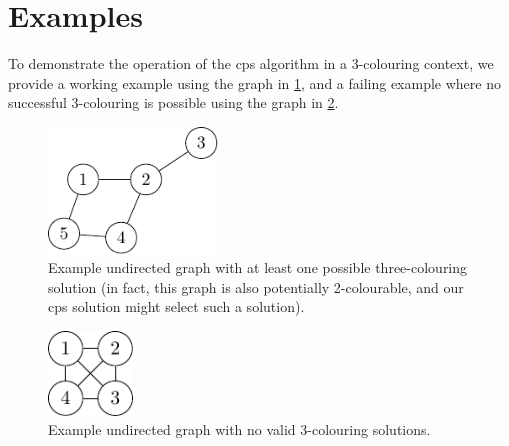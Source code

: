 \section{\label{sec:gcol:examples}Examples}

To demonstrate the operation of the \gls{cps} algorithm in a 3-colouring context, we provide a working example using the graph in \cref{fig:gcol:examplegraph}, and a failing example where no successful 3-colouring is possible using the graph in \cref{fig:gcol:examplegraphnosol}.

\begin{figure}
    \centering
    \includegraphics[width=0.4\textwidth]{chapters/gcol/figs/examplegraph1-figure2.pdf}
    \caption[Example undirected graph with at least one possible three-colouring solution]{Example undirected graph with at least one possible three-colouring solution (in fact, this graph is also potentially 2-colourable, and our \gls{cps} solution might select such a solution).}
    \label{fig:gcol:examplegraph}
\end{figure}

\begin{figure}
    \centering
    \includegraphics[width=0.2\textwidth]{chapters/gcol/figs/examplegraph1-figure3.pdf}
    \caption{Example undirected graph with no valid 3-colouring solutions.}
    \label{fig:gcol:examplegraphnosol}
\end{figure}

